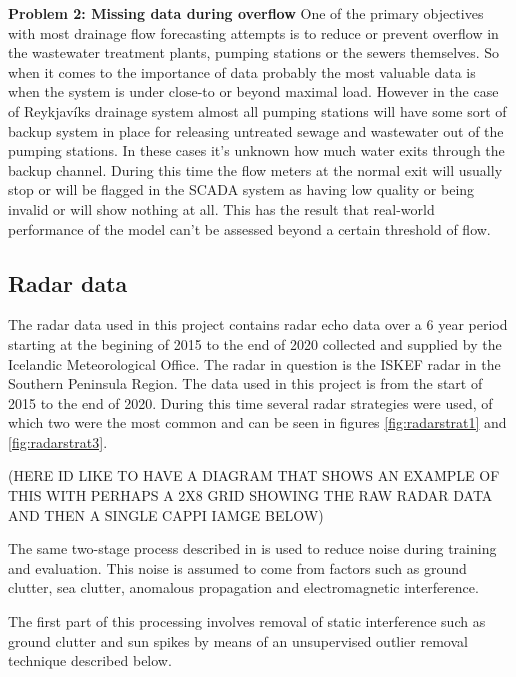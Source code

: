 \textbf{Problem 2: Missing data during overflow}
One of the primary objectives with most drainage flow forecasting attempts is to reduce or prevent overflow in the wastewater treatment plants, pumping stations or the sewers themselves. So when it comes to the importance of data probably the most valuable data is when the system is under close-to or beyond maximal load. However in the case of Reykjavíks drainage system almost all pumping stations  will have some sort of backup system in place for releasing untreated sewage and wastewater out of the pumping stations. In these cases it's unknown how much water exits through the backup channel. During this time the flow meters at the normal exit will usually stop or will be flagged in the SCADA system as having low quality or being invalid or will show nothing at all. This has the result that real-world performance of the model can't be assessed beyond a certain threshold of flow. 

\subsection{Radar data}
The radar data used in this project contains radar echo data over a 6 year period starting at the begining of 2015 to the end of 2020 collected and supplied by the Icelandic Meteorological Office. The radar in question is the ISKEF radar in the Southern Peninsula Region. The data used in this project is from the start of 2015 to the end of 2020. During this time several radar strategies were used, of which two were the most common and can be seen in figures \ref{fig:radarstrat1} and \ref{fig:radarstrat3}. 

(HERE ID LIKE TO HAVE A DIAGRAM THAT SHOWS AN EXAMPLE OF THIS WITH PERHAPS A 2X8 GRID SHOWING THE RAW RADAR DATA AND THEN A SINGLE CAPPI IAMGE BELOW)


The same two-stage process described in \cite{shi2015convolutional} is used to reduce noise during training and evaluation. This noise is assumed to come from factors such as ground clutter, sea clutter, anomalous propagation and electromagnetic interference.

The first part of this processing involves removal of static interference such as ground clutter and sun spikes by means of an unsupervised outlier removal technique described below. 

